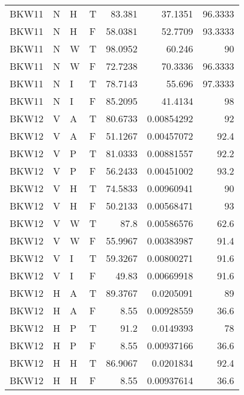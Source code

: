 \begin{longtable}{llllrrr}
    BKW11    & N     & H     & T          & 83.381     & 37.1351     & 96.3333  \\
    BKW11    & N     & H     & F          & 58.0381    & 52.7709     & 93.3333  \\
    BKW11    & N     & W     & T          & 98.0952    & 60.246      & 90       \\
    BKW11    & N     & W     & F          & 72.7238    & 70.3336     & 96.3333  \\
    BKW11    & N     & I     & T          & 78.7143    & 55.696      & 97.3333  \\
    BKW11    & N     & I     & F          & 85.2095    & 41.4134     & 98       \\
    BKW12    & V     & A     & T          & 80.6733    & 0.00854292  & 92       \\
    BKW12    & V     & A     & F          & 51.1267    & 0.00457072  & 92.4     \\
    BKW12    & V     & P     & T          & 81.0333    & 0.00881557  & 92.2     \\
    BKW12    & V     & P     & F          & 56.2433    & 0.00451002  & 93.2     \\
    BKW12    & V     & H     & T          & 74.5833    & 0.00960941  & 90       \\
    BKW12    & V     & H     & F          & 50.2133    & 0.00568471  & 93       \\
    BKW12    & V     & W     & T          & 87.8       & 0.00586576  & 62.6     \\
    BKW12    & V     & W     & F          & 55.9967    & 0.00383987  & 91.4     \\
    BKW12    & V     & I     & T          & 59.3267    & 0.00800271  & 91.6     \\
    BKW12    & V     & I     & F          & 49.83      & 0.00669918  & 91.6     \\
    BKW12    & H     & A     & T          & 89.3767    & 0.0205091   & 89       \\
    BKW12    & H     & A     & F          & 8.55       & 0.00928559  & 36.6     \\
    BKW12    & H     & P     & T          & 91.2       & 0.0149393   & 78       \\
    BKW12    & H     & P     & F          & 8.55       & 0.00937166  & 36.6     \\
    BKW12    & H     & H     & T          & 86.9067    & 0.0201834   & 92.4     \\
    BKW12    & H     & H     & F          & 8.55       & 0.00937614  & 36.6     \\

\end{longtable}
